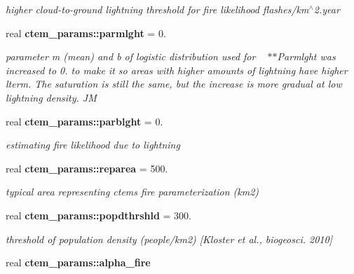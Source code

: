 \begin{DoxyCompactItemize}
\begin{DoxyCompactList}\small\item\em higher cloud-\/to-\/ground lightning threshold for fire likelihood flashes/km$^\wedge$2.year \end{DoxyCompactList}\item 
\hypertarget{namespacectem__params_a689825245070f06cb1156044940af148}{}real {\bfseries ctem\+\_\+params\+::parmlght} = 0.\label{namespacectem__params_a689825245070f06cb1156044940af148}

\begin{DoxyCompactList}\small\item\em parameter m (mean) and b of logistic distribution used for ~\newline
$\ast$$\ast$\+Parmlght was increased to 0. to make it so areas with higher amounts of lightning have higher lterm. The saturation is still the same, but the increase is more gradual at low lightning density. J\+M \end{DoxyCompactList}\item 
\hypertarget{namespacectem__params_a1b407a06b92feb424b8338ff8c19e966}{}real {\bfseries ctem\+\_\+params\+::parblght} = 0.\label{namespacectem__params_a1b407a06b92feb424b8338ff8c19e966}

\begin{DoxyCompactList}\small\item\em estimating fire likelihood due to lightning \end{DoxyCompactList}\item 
\hypertarget{namespacectem__params_a7f4c73f924960839ad06590397b9855b}{}real {\bfseries ctem\+\_\+params\+::reparea} = 500.\label{namespacectem__params_a7f4c73f924960839ad06590397b9855b}

\begin{DoxyCompactList}\small\item\em typical area representing ctem\textquotesingle{}s fire parameterization (km2) \end{DoxyCompactList}\item 
\hypertarget{namespacectem__params_a0a275d244526015c0b2ea9dc397c2256}{}real {\bfseries ctem\+\_\+params\+::popdthrshld} = 300.\label{namespacectem__params_a0a275d244526015c0b2ea9dc397c2256}

\begin{DoxyCompactList}\small\item\em threshold of population density (people/km2) \mbox{[}Kloster et al., biogeosci. 2010\mbox{]} \end{DoxyCompactList}\item 
\hypertarget{namespacectem__params_aa722898e44ec14ac7b561ee2917529a5}{}real {\bfseries ctem\+\_\+params\+::alpha\+\_\+fire}\label{namespacectem__params_aa722898e44ec14ac7b561ee2917529a5}


\end{DoxyCompactItemize}
